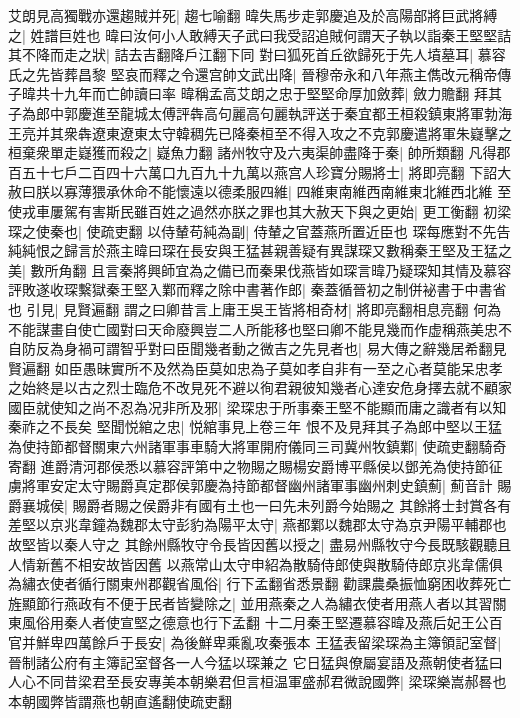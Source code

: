 艾朗見高獨戰亦還趨賊并死|{
	趨七喻翻}
暐失馬步走郭慶追及於高陽部將巨武將縛之|{
	姓譜巨姓也}
暐曰汝何小人敢縛天子武曰我受詔追賊何謂天子執以詣秦王堅堅詰其不降而走之狀|{
	詰去吉翻降戶江翻下同}
對曰狐死首丘欲歸死于先人墳墓耳|{
	慕容氏之先皆葬昌黎}
堅哀而釋之令還宫帥文武出降|{
	晉穆帝永和八年燕主儁改元稱帝傳子暐共十九年而亡帥讀曰率}
暐稱孟高艾朗之忠于堅堅命厚加斂葬|{
	斂力贍翻}
拜其子為郎中郭慶進至龍城太傅評犇高句麗高句麗執評送于秦宜都王桓殺鎮東將軍勃海王亮并其衆犇遼東遼東太守韓稠先已降秦桓至不得入攻之不克郭慶遣將軍朱嶷擊之桓棄衆單走嶷獲而殺之|{
	嶷魚力翻}
諸州牧守及六夷渠帥盡降于秦|{
	帥所類翻}
凡得郡百五十七戶二百四十六萬口九百九十九萬以燕宫人珍寶分賜將士|{
	將即亮翻}
下詔大赦曰朕以寡薄猥承休命不能懷遠以德柔服四維|{
	四維東南維西南維東北維西北維}
至使戎車屢駕有害斯民雖百姓之過然亦朕之罪也其大赦天下與之更始|{
	更工衡翻}
初梁琛之使秦也|{
	使疏吏翻}
以侍輦苟純為副|{
	侍輦之官蓋燕所置近臣也}
琛每應對不先告純純恨之歸言於燕主暐曰琛在長安與王猛甚親善疑有異謀琛又數稱秦王堅及王猛之美|{
	數所角翻}
且言秦將興師宜為之備已而秦果伐燕皆如琛言暐乃疑琛知其情及慕容評敗遂收琛繫獄秦王堅入鄴而釋之除中書著作郎|{
	秦蓋循晉初之制併袐書于中書省也}
引見|{
	見賢遍翻}
謂之曰卿昔言上庸王吳王皆將相奇材|{
	將即亮翻相息亮翻}
何為不能謀畫自使亡國對曰天命廢興豈二人所能移也堅曰卿不能見幾而作虚稱燕美忠不自防反為身禍可謂智乎對曰臣聞幾者動之微吉之先見者也|{
	易大傳之辭幾居希翻見賢遍翻}
如臣愚昧實所不及然為臣莫如忠為子莫如孝自非有一至之心者莫能呆忠孝之始終是以古之烈士臨危不改見死不避以徇君親彼知幾者心達安危身擇去就不顧家國臣就使知之尚不忍為况非所及邪|{
	梁琛忠于所事秦王堅不能顯而庸之識者有以知秦祚之不長矣}
堅聞悦綰之忠|{
	悦綰事見上卷三年}
恨不及見拜其子為郎中堅以王猛為使持節都督關東六州諸軍事車騎大將軍開府儀同三司冀州牧鎮鄴|{
	使疏吏翻騎奇寄翻}
進爵清河郡侯悉以慕容評第中之物賜之賜楊安爵博平縣侯以鄧羌為使持節征虜將軍安定太守賜爵真定郡侯郭慶為持節都督幽州諸軍事幽州刺史鎮薊|{
	薊音計}
賜爵襄城侯|{
	賜爵者賜之侯爵非有國有土也一曰先未列爵今始賜之}
其餘將士封賞各有差堅以京兆韋鐘為魏郡太守彭豹為陽平太守|{
	燕都鄴以魏郡太守為京尹陽平輔郡也故堅皆以秦人守之}
其餘州縣牧守令長皆因舊以授之|{
	盡易州縣牧守今長既駭觀聽且人情新舊不相安故皆因舊}
以燕常山太守申紹為散騎侍郎使與散騎侍郎京兆韋儒俱為繡衣使者循行關東州郡觀省風俗|{
	行下孟翻省悉景翻}
勸課農桑振恤窮困收葬死亡旌顯節行燕政有不便于民者皆變除之|{
	並用燕秦之人為繡衣使者用燕人者以其習關東風俗用秦人者使宣堅之德意也行下孟翻}
十二月秦王堅遷慕容暐及燕后妃王公百官并鮮卑四萬餘戶于長安|{
	為後鮮卑乘亂攻秦張本}
王猛表留梁琛為主簿領記室督|{
	晉制諸公府有主簿記室督各一人今猛以琛兼之}
它日猛與僚屬宴語及燕朝使者猛曰人心不同昔梁君至長安專美本朝樂君但言桓温軍盛郝君微說國弊|{
	梁琛樂嵩郝晷也本朝國弊皆謂燕也朝直遙翻使疏吏翻}
